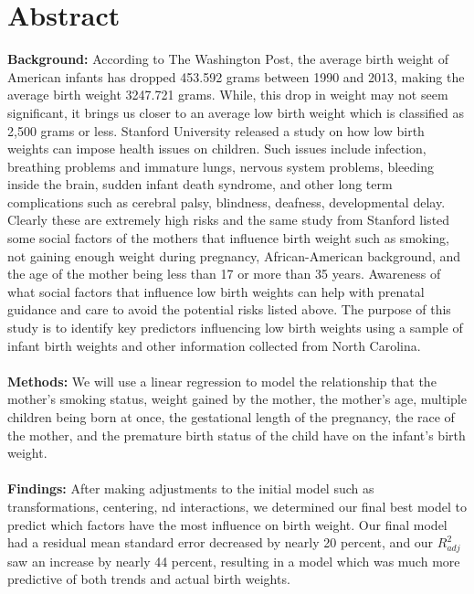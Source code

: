 \documentclass{article}\usepackage[]{graphicx}\usepackage[]{xcolor}
\begin{document}
\section{\textbf{Abstract}}
\textbf{Background:} According to The Washington Post, the average birth weight of American infants has dropped 453.592 grams between 1990 and 2013, making the average birth weight 3247.721 grams. While, this drop in weight may not seem significant, it brings us closer to an average low birth weight which is classified as 2,500 grams or less. Stanford University released a study on how low birth weights can impose health issues on children. Such issues include infection, breathing problems and immature lungs, nervous system problems, bleeding inside the brain, sudden infant death syndrome, and other long term complications such as cerebral palsy, blindness, deafness, developmental delay. Clearly these are extremely high risks and the same study from Stanford listed some social factors of the mothers that influence birth weight such as smoking, 
not gaining enough weight during pregnancy, African-American background,  and the age of the mother being less than 17 or more than 35 years. Awareness of what social factors that influence low birth weights can help with prenatal guidance and care to avoid the potential risks listed above. The purpose of this study is to identify key predictors influencing low birth weights using a sample of infant birth weights and other information collected from North Carolina. \\ \\
\textbf{Methods:} We will use a linear regression to model the relationship that the mother's smoking status, weight gained by the mother, the mother's age, multiple children being born at once, the gestational length of the pregnancy, the race of the mother, and the premature birth status of the child have on the infant's birth weight. \\ \\
\textbf{Findings:} After making adjustments to the initial model such as transformations, centering,  nd interactions, we determined our final best model to predict which factors have the most influence on birth weight. Our final model had a residual mean standard error decreased by nearly 20 percent, and our $R^2_{adj}$ saw an increase by nearly 44 percent, resulting in a model which was much more predictive of both trends and actual birth weights.
\end{document}
